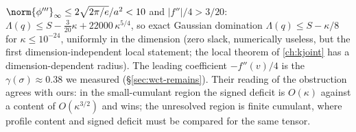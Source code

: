\begin{enumerate}
$\norm{\phi'''}_\infty\le2\sqrt{2\pi/e}/a^2<10$ and $|f''|/4>3/20$: $\Lambda(q)\le S-\tfrac3{20}\kappa+22000\,\kappa^{5/4}$, so exact Gaussian domination $\Lambda(q)\le S-\kappa/8$ for
$\kappa\le10^{-24}$, uniformly in the dimension (zero slack, numerically useless, but the first dimension-independent local statement; the local theorem of \autoref{ch:kjoint} has a
dimension-dependent radius). The leading coefficient $-f''(v)/4$ is the $\gamma(\sigma)\approx0.38$ we measured (\S\ref{sec:wct-remains}). Their reading of the obstruction agrees with ours: in the
small-cumulant region the signed deficit is $O(\kappa)$ against a content of $O(\kappa^{3/2})$ and wins; the unresolved region is finite cumulant, where profile content and signed deficit must be
compared for the same tensor.
\end{enumerate}

